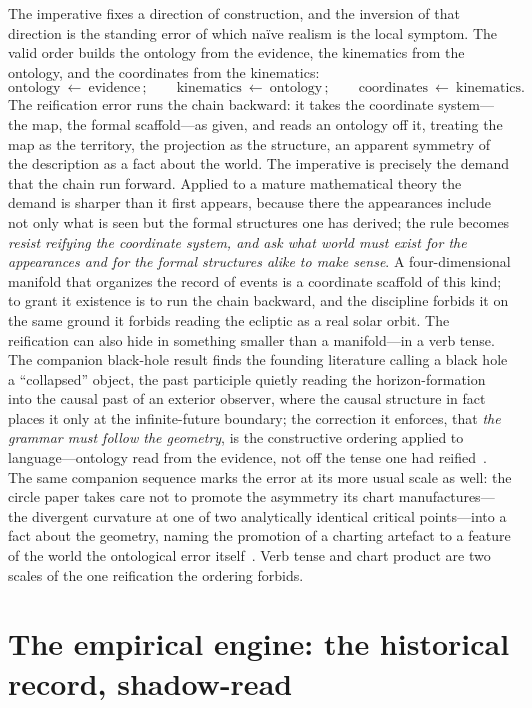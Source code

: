 \documentclass[11pt,a4paper]{article}
\begin{document}
The imperative fixes a direction of construction, and the inversion of that direction is the standing error of which naïve realism is the local symptom. The valid order builds the ontology from the evidence, the kinematics from the ontology, and the coordinates from the kinematics:
\[
\text{ontology}\ \longleftarrow\ \text{evidence}\,;\qquad
\text{kinematics}\ \longleftarrow\ \text{ontology}\,;\qquad
\text{coordinates}\ \longleftarrow\ \text{kinematics}.
\]
The reification error runs the chain backward: it takes the coordinate system---the map, the formal scaffold---as given, and reads an ontology off it, treating the map as the territory, the projection as the structure, an apparent symmetry of the description as a fact about the world. The imperative is precisely the demand that the chain run forward. Applied to a mature mathematical theory the demand is sharper than it first appears, because there the appearances include not only what is seen but the formal structures one has derived; the rule becomes \emph{resist reifying the coordinate system, and ask what world must exist for the appearances and for the formal structures alike to make sense}. A four-dimensional manifold that organizes the record of events is a coordinate scaffold of this kind; to grant it existence is to run the chain backward, and the discipline forbids it on the same ground it forbids reading the ecliptic as a real solar orbit. The reification can also hide in something smaller than a manifold---in a verb tense. The companion black-hole result finds the founding literature calling a black hole a ``collapsed'' object, the past participle quietly reading the horizon-formation into the causal past of an exterior observer, where the causal structure in fact places it only at the infinite-future boundary; the correction it enforces, that \emph{the grammar must follow the geometry}, is the constructive ordering applied to language---ontology read from the evidence, not off the tense one had reified~\cite{JanzenBHcausality}. The same companion sequence marks the error at its more usual scale as well: the circle paper takes care not to promote the asymmetry its chart manufactures---the divergent curvature at one of two analytically identical critical points---into a fact about the geometry, naming the promotion of a charting artefact to a feature of the world the ontological error itself~\cite{JanzenCircle}. Verb tense and chart product are two scales of the one reification the ordering forbids.

\section{The empirical engine: the historical record, shadow-read}\label{sec:engine}
\end{document}
